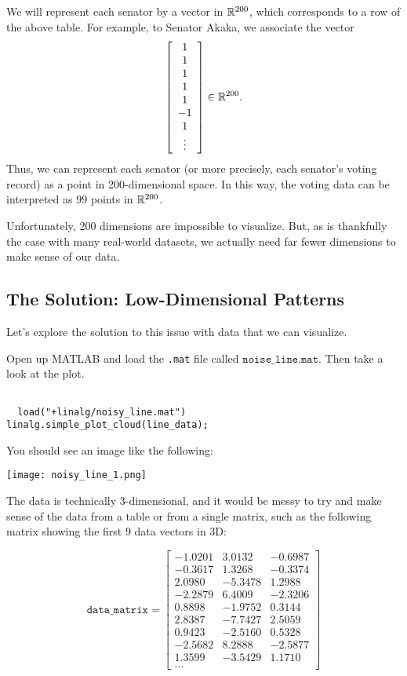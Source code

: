 \documentclass{ximera}
\begin{document}
We will represent each senator by a vector in $\R^{200}$, which
corresponds to a row of the above table. For example, to Senator
Akaka, we associate the vector
\begin{equation*}
  \startmat{c} 1 \\ 1 \\ 1 \\ 1 \\ 1 \\ -1 \\ 1 \\ \vdots \stopmat
  \in\R^{200}.
\end{equation*}
Thus, we can represent each senator (or more precisely, each senator's
voting record) as a point in 200-dimensional space. In this way, the
voting data can be interpreted as $99$ points in $\R^{200}$.

Unfortunately, 200 dimensions are impossible to visualize. But, as is thankfully the case with many real-world datasets, we actually need far fewer dimensions to make sense of our data. 

\subsection*{The Solution: Low-Dimensional Patterns}

Let's explore the solution to this issue with data that we can visualize. 

Open up MATLAB and load the \texttt{.mat} file called $\texttt{noise\_line.mat}$. Then take a look at the plot.

\begin{verbatim}

  load("+linalg/noisy_line.mat")
linalg.simple_plot_cloud(line_data);

\end{verbatim}

You should see an image like the following:

\begin{center}
  \texttt{[image: noisy\_line\_1.png]}
\end{center}

The data is technically 3-dimensional, and it would be messy to try and make sense of the data from a table or from a single matrix, such as the following matrix showing the first 9 data vectors in 3D:

\[
\texttt{data\_matrix}=\begin{bmatrix}
-1.0201 & 3.0132  & -0.6987 \\
-0.3617 & 1.3268  & -0.3374 \\
2.0980  & -5.3478 & 1.2988  \\
-2.2879 & 6.4009  & -2.3206 \\
0.8898  & -1.9752 & 0.3144  \\
2.8387  & -7.7427 & 2.5059  \\
0.9423  & -2.5160 & 0.5328  \\
-2.5682 & 8.2888  & -2.5877 \\
1.3599  & -3.5429 & 1.1710\\
\ldots
\end{bmatrix}
\]
\end{document}
